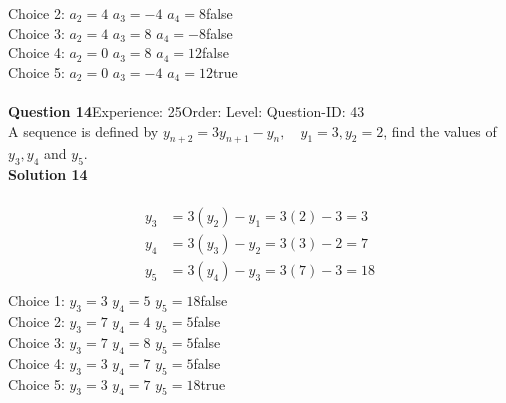 \documentclass{article}
\begin{document}
Choice 2: \hspace{20pt}$a_2=4 \,\, a_3=-4 \,\, a_4=8 $\hspace{20pt}false\\
Choice 3: \hspace{20pt}$a_2=4 \,\, a_3=8 \,\, a_4=-8 $\hspace{20pt}false\\
Choice 4: \hspace{20pt}$a_2=0 \,\, a_3=8 \,\, a_4=12 $\hspace{20pt}false\\
Choice 5: \hspace{20pt}$a_2=0 \,\, a_3=-4 \,\, a_4=12 $\hspace{20pt}true\\
\\[4pt]
\noindent\textbf{Question 14}\hspace{20pt}Experience: 25\hspace{20pt}Order: \hspace{20pt}Level: \hspace{20pt}Question-ID: 43\\[2pt]
A sequence is defined by $y_{n+2}=3y_{n+1}-y_n, \quad y_1=3,y_2=2$, find the values of $y_3,y_4$ and $y_5$.\\[4pt]
\noindent\textbf{Solution 14}\\[2pt]
\\[-35pt]\begin{align*}
y_3&=3(y_2)-y_1=3(2)-3=3\\[2pt]
y_4&=3(y_3)-y_2=3(3)-2=7\\[2pt]
y_5&=3(y_4)-y_3=3(7)-3=18\\[-30pt]
\end{align*}
Choice 1: \hspace{20pt}$y_3=3 \,\, y_4=5 \,\, y_5=18 $\hspace{20pt}false\\
Choice 2: \hspace{20pt}$y_3=7 \,\, y_4=4 \,\, y_5=5 $\hspace{20pt}false\\
Choice 3: \hspace{20pt}$y_3=7 \,\, y_4=8 \,\, y_5=5 $\hspace{20pt}false\\
Choice 4: \hspace{20pt}$y_3=3 \,\, y_4=7 \,\, y_5=5 $\hspace{20pt}false\\
Choice 5: \hspace{20pt}$y_3=3 \,\, y_4=7 \,\, y_5=18 $\hspace{20pt}true\\
\end{document}
